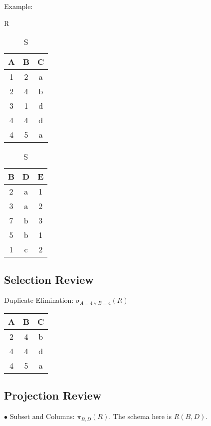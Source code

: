 \documentclass[twoside]{article}
\begin{document}
Example:

\begin{table}[!htb]
    \begin{minipage}{.5\linewidth}
      \caption{R}
      \centering
        \begin{tabular}{c|c|c}
            A & B & C \\
            \hline
            1 & 2 & a \\
            2 & 4 & b \\
            3 & 1 & d \\
            4 & 4 & d \\
            4 & 5 & a \\
        \end{tabular}
    \end{minipage}
    \begin{minipage}{.25\linewidth}
      \centering
        \caption{S}
        \begin{tabular}{c|c|c}
            B & D & E \\
            \hline
            2 & a & 1 \\
            3 & a & 2 \\
            7 & b & 3 \\
            5 & b & 1 \\
            1 & c & 2 \\
        \end{tabular}
    \end{minipage} 
\end{table}

\subsection*{Selection Review}
Duplicate Elimination: $\sigma_{A=4 \vee B=4}(R)$

\begin{table}[!htb]
    \centering
    \begin{tabular}{c|c|c}
        A & B & C \\
        \hline
        2 & 4 & b \\
        4 & 4 & d \\
        4 & 5 & a \\
    \end{tabular}
\end{table}

\subsection*{Projection Review}
$\bullet$ Subset and Columns: $\pi_{B,D}(R)$. The schema here is $R(B,D)$.
\end{document}
